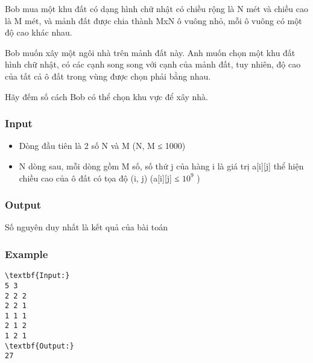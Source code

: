 

Bob mua một khu đất có dạng hình chữ nhật có chiều rộng là N mét và chiều cao là M mét, và mảnh đất được chia thành MxN ô vuông nhỏ, mỗi ô vuông có một độ cao khác nhau.

Bob muốn xây một ngôi nhà trên mảnh đất này. Anh muốn chọn một khu đất hình chữ nhật, có các cạnh song song với cạnh của mảnh đất, tuy nhiên, độ cao của tất cả ô đất trong vùng được chọn phải bằng nhau.

Hãy đếm số cách Bob có thể chọn khu vực để xây nhà.

\subsubsection{Input}
\begin{itemize}
	\item Dòng đầu tiên là 2 số N và M (N, M ≤ 1000)
	\item N dòng sau, mỗi dòng gồm M số, số thứ j của hàng i là giá trị a[i][j] thể hiện chiều cao của ô đất có tọa độ (i, j) (a[i][j] ≤ $10^{9}$ )
\end{itemize}

\subsubsection{Output}

Số nguyên duy nhất là kết quả của bài toán

\subsubsection{Example}
\begin{verbatim}
\textbf{Input:}
5 3
2 2 2
2 2 1
1 1 1
2 1 2
1 2 1
\textbf{Output:} 
27\end{verbatim}
